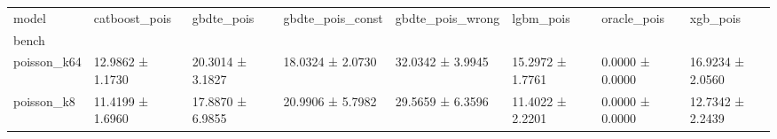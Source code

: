 \begin{tabular}{llllllll}
\toprule
model & catboost_pois & gbdte_pois & gbdte_pois_const & gbdte_pois_wrong & lgbm_pois & oracle_pois & xgb_pois \\
bench &  &  &  &  &  &  &  \\
\midrule
poisson_k64 & 12.9862 ± 1.1730 & 20.3014 ± 3.1827 & 18.0324 ± 2.0730 & 32.0342 ± 3.9945 & 15.2972 ± 1.7761 & 0.0000 ± 0.0000 & 16.9234 ± 2.0560 \\
poisson_k8 & 11.4199 ± 1.6960 & 17.8870 ± 6.9855 & 20.9906 ± 5.7982 & 29.5659 ± 6.3596 & 11.4022 ± 2.2201 & 0.0000 ± 0.0000 & 12.7342 ± 2.2439 \\
\bottomrule
\end{tabular}
